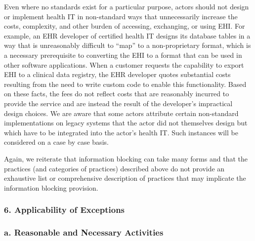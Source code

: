 \documentclass[twoside,11pt]{article}
\begin{document}
          Even where no standards exist for a particular purpose, actors should not design or implement health IT in non-standard ways that unnecessarily increase the costs, complexity, and other burden of accessing, exchanging, or using EHI. For example, an EHR developer of certified health IT designs its database tables in a way that is unreasonably difficult to “map” to a non-proprietary format, which is a necessary prerequisite to converting the EHI to a format that can be used in other software applications. When a customer requests the capability to export EHI to a clinical data registry, the EHR developer quotes substantial costs resulting from the need to write custom code to enable this functionality. Based on these facts, the fees do not reflect costs that are reasonably incurred to provide the service and are instead the result of the developer's impractical design choices. We are aware that some actors attribute certain non-standard implementations on legacy systems that the actor did not themselves design but which have to be integrated into the actor's health IT. Such instances will be considered on a case by case basis.



          Again, we reiterate that information blocking can take many forms and that the practices (and categories of practices) described above do not provide an exhaustive list or comprehensive description of practices that may implicate the information blocking provision. \ifhmode\expandafter\xspace\fi 
          


          \subsubsection{6. Applicability of Exceptions}

          \subsubsection{a. Reasonable and Necessary Activities}
\end{document}
